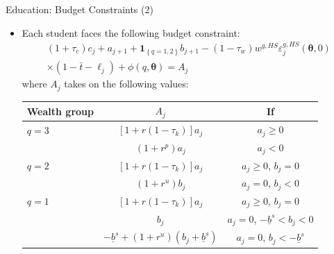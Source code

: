 \documentclass{beamer}
\begin{document}
\begin{frame}{Education: Budget Constraints (2)}
\begin{itemize}
  \item Each student faces the following budget constraint:
  		\begin{equation*}
  		\begin{aligned}
        (1+\tau_c)c_j+a_{j+1}+\textbf{1}_{\left\{q=1,2\right\}}b_{j+1}-(1-\tau_w)w^{g,HS}						\varepsilon^{g,HS}_j(\boldsymbol{\theta},0) \\				
        \times (1-\bar{t}-\ell_j) + \phi(q,\boldsymbol{\theta}) = A_j
        \end{aligned}
        \end{equation*}
        where $A_j$ takes on the following values:
\begin{table}[H]
\begin{center}
  \begin{tabular}{ l | c | c}
      \hline
     Wealth group & $A_j$ & If  \\ \hline
     $q=3$ & $[1+r(1-\tau_k)]a_j$ & $a_j\geq0$  \\ 
     & $(1+r^p)a_j$ & $a_j<0$  \\ \hline
     $q=2$ & $[1+r(1-\tau_k)]a_j$ & $a_j\geq0$, $b_j=0$ \\ 
     & $(1+r^u)b_j$ & $a_j=0$, $b_j<0$  \\ \hline
     $q=1$ & $[1+r(1-\tau_k)]a_j$ & $a_j\geq0$, $b_j=0$ \\ 
     & $b_j$ & $a_j=0$, $-\underline{b}^s<b_j<0$  \\ 
     & $-\underline{b}^s+(1+r^u)(b_j+\underline{b}^s)$ & $a_j=0$, $b_j<-\underline{b}^s$	\\ 
      \hline
  \end{tabular}
\end{center}
\end {table}
\end{itemize}      
\end{frame} 
\end{document}
